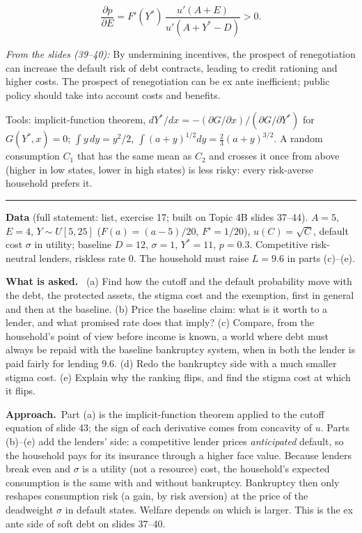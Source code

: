 \documentclass[11pt,a4paper]{article}
\newcommand{\asked}{\par\medskip\noindent\textbf{What is asked.}~}
\newcommand{\approach}{\par\smallskip\noindent\textbf{Approach.}~}
\newcommand{\stmtend}{\par\endgroup\nopagebreak\noindent\rule{\linewidth}{0.4pt}\par\medskip}
\begin{document}
\[\frac{\partial p}{\partial E} = F'(Y^*)\,\frac{u'(A + E)}{u'(A + Y^* - D)} > 0.\]

\emph{From the slides (39--40):} By undermining incentives, the prospect of renegotiation can
increase the default risk of debt contracts, leading to credit rationing and higher costs. The
prospect of renegotiation can be ex ante inefficient; public policy should take into account costs
and benefits.

Tools: implicit-function theorem, \(dY^*/dx = -(\partial G/\partial x)/(\partial G/\partial Y^*)\)
for \(G(Y^*, x) = 0\); \(\int y\,dy = y^2/2\), \(\int (a + y)^{1/2} dy = \tfrac23 (a + y)^{3/2}\). A
random consumption \(C_1\) that has the same mean as \(C_2\) and crosses it once from above (higher
in low states, lower in high states) is less risky: every risk-averse household prefers it.
\stmtend

\noindent\textbf{Data} (full statement: list, exercise 17; built on Topic 4B slides 37--44). $A=5$, $E=4$,
$Y\sim U[5,25]$ ($F(a)=(a-5)/20$, $F'=1/20$), $u(C)=\sqrt C$, default cost $\sigma$ in utility; baseline $D=12$,
$\sigma=1$, $Y^*=11$, $p=0.3$. Competitive risk-neutral lenders, riskless rate $0$. The household must raise
$L=9.6$ in parts (c)--(e).

\asked
(a) Find how the cutoff and the default probability move with the debt, the protected assets, the stigma cost
and the exemption, first in general and then at the baseline.
(b) Price the baseline claim: what is it worth to a lender, and what promised rate does that imply?
(c) Compare, from the household's point of view before income is known, a world where debt must always be
repaid with the baseline bankruptcy system, when in both the lender is paid fairly for lending $9.6$.
(d) Redo the bankruptcy side with a much smaller stigma cost.
(e) Explain why the ranking flips, and find the stigma cost at which it flips.

\approach Part (a) is the implicit-function theorem applied to the cutoff equation of slide 43; the sign of
each derivative comes from concavity of $u$. Parts (b)--(e) add the lenders' side: a competitive lender
prices \emph{anticipated} default, so the household pays for its insurance through a higher face value. Because
lenders break even and $\sigma$ is a utility (not a resource) cost, the household's expected consumption is the
same with and without bankruptcy. Bankruptcy then only reshapes consumption risk (a gain, by risk aversion) at
the price of the deadweight $\sigma$ in default states. Welfare depends on which is larger. This is the ex ante
side of soft debt on slides 37--40.
\end{document}
